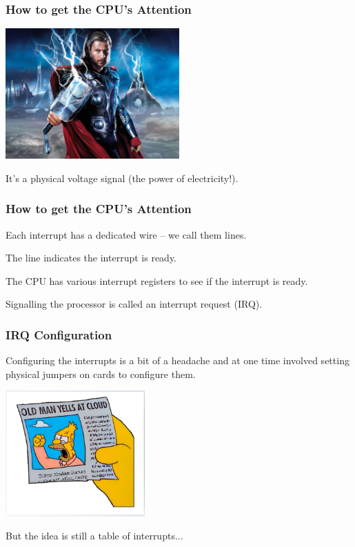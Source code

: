 \begin{frame}
\frametitle{How to get the CPU's Attention}

\begin{center}
	\includegraphics[width=0.5\textwidth]{images/thor.jpg}
\end{center}

It's a physical voltage signal (the power of electricity!).

\end{frame}

\begin{frame}
\frametitle{How to get the CPU's Attention}

Each interrupt has a dedicated wire -- we call them \alert{line}s.

The line indicates the interrupt is ready.

The CPU has various interrupt registers to see if the interrupt is ready.

Signalling the processor is called an \alert{interrupt request (IRQ)}.

\end{frame}

\begin{frame}
\frametitle{IRQ Configuration}

Configuring the interrupts is a bit of a headache and at one time involved setting physical jumpers on cards to configure them.

\begin{center}
	\includegraphics[width=0.4\textwidth]{images/oldmancloud.png}
\end{center}

But the idea is still a table of interrupts...

\end{frame}

